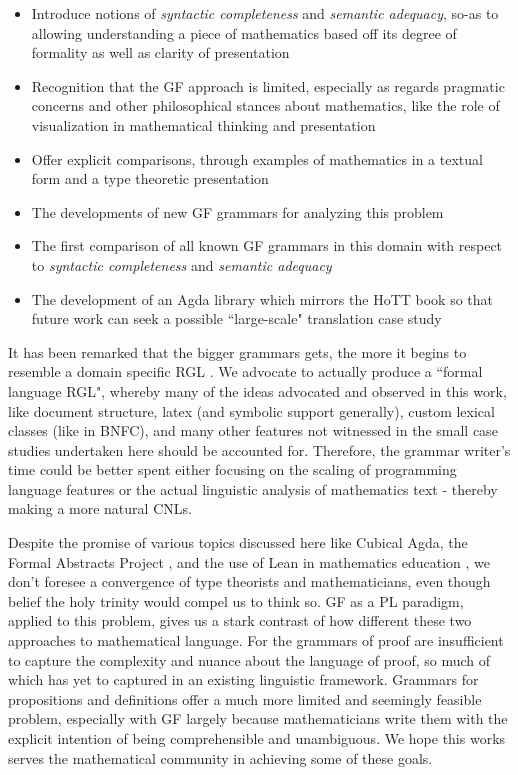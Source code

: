 \begin{itemize}
\item Introduce notions of \emph{syntactic completeness} and \emph{semantic adequacy}, so-as to
allowing understanding a piece of mathematics based off its degree of formality
as well as clarity of presentation
\item Recognition that the GF approach is limited, especially as regards pragmatic
concerns and other philosophical stances about mathematics, like the role of
visualization in mathematical thinking and presentation
\item Offer explicit comparisons, through examples of mathematics in a textual form and a type
  theoretic presentation
\item The developments of new GF grammars for analyzing this problem
\item The first comparison of all known GF grammars in this domain with respect
  to \emph{syntactic completeness} and \emph{semantic adequacy}
\item The development of an Agda library which mirrors the HoTT book so that
  future work can seek a possible ``large-scale" translation case study
\end{itemize}


 It has been remarked that the bigger grammars gets, the more it begins to
resemble a domain specific RGL \cite{angelovSS}. We advocate to actually produce
a ``formal language RGL", whereby many of the ideas advocated and observed in
this work, like document structure, latex (and symbolic support generally),
custom lexical classes (like in BNFC), and many other features not witnessed in
the small case studies undertaken here should be accounted for. Therefore, the
grammar writer's time could be better spent either focusing on the scaling of
programming language features or the actual linguistic analysis of
mathematics text - thereby making a more natural CNLs.

Despite the promise of various topics discussed here like Cubical Agda, the
Formal Abstracts Project , and the use of Lean in mathematics education
\cite{buzzard2020will}, we don't foresee a convergence of type theorists and
mathematicians, even though belief the holy trinity would compel us to think so.
GF as a PL paradigm, applied to this problem, gives us a stark contrast of how
different these two approaches to mathematical language. For the grammars of
proof are insufficient to capture the complexity and nuance about the language
of proof, so much of which has yet to captured in an existing linguistic
framework. Grammars for propositions and definitions offer a much more limited
and seemingly feasible problem, especially with GF largely because
mathematicians write them with the explicit intention of being comprehensible
and unambiguous. We hope this works serves the mathematical community in
achieving some of these goals.


